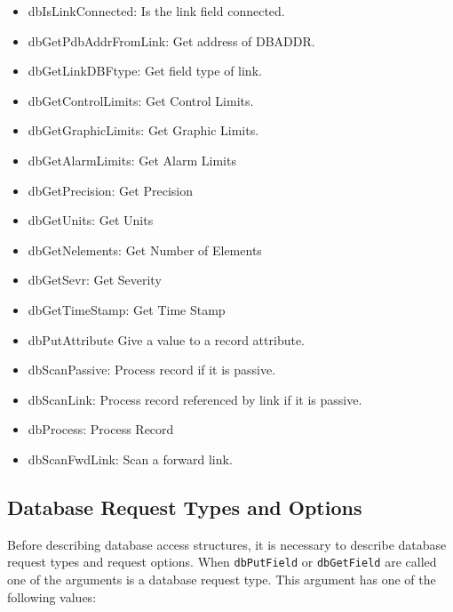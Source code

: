 \begin{itemize}
\item dbIsLinkConnected: Is the link field connected.

\item dbGetPdbAddrFromLink: Get address of DBADDR.

\item dbGetLinkDBFtype: Get field type of link.

\item dbGetControlLimits: Get Control Limits.

\item dbGetGraphicLimits: Get Graphic Limits.

\item dbGetAlarmLimits: Get Alarm Limits

\item dbGetPrecision: Get Precision

\item dbGetUnits: Get Units

\item dbGetNelements: Get Number of Elements

\item dbGetSevr: Get Severity

\item dbGetTimeStamp: Get Time Stamp

\item dbPutAttribute Give a value to a record attribute.

\item dbScanPassive: Process record if it is passive.

\item dbScanLink: Process record referenced by link if it is passive.

\item dbProcess: Process Record

\item dbScanFwdLink: Scan a forward link.

\end{itemize}

\subsection{Database Request Types and Options}

Before describing database access structures, it is necessary to describe database request types and request options. When 
\verb|dbPutField| or \verb|dbGetField| are called one of the arguments is a database request type. This argument has one of the 
following values: 

